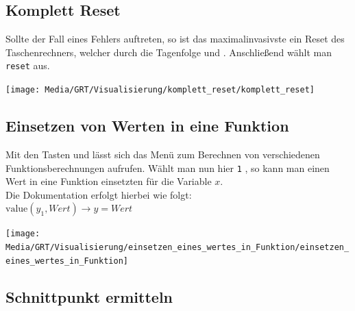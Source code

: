 \subsection{Komplett Reset}\label{sec:Komplett Reset}
\begin{paracol}{2}
\begin{flushleft}
	Sollte der Fall eines Fehlers auftreten, so ist das maximalinvasivste ein Reset des Taschenrechners, welcher durch die Tagenfolge  und \gtr{+}. Anschließend wählt man \texttt{reset} aus.
\end{flushleft}
\switchcolumn
\begin{flushright}
	\texttt{[image: Media/GRT/Visualisierung/komplett\_reset/komplett\_reset]}
\end{flushright}	
\end{paracol}

\subsection{Einsetzen von Werten in eine Funktion}\label{sec:Einsetzen von Werten in eine Funktion}
\begin{paracol}{2}
\begin{flushleft}
	Mit den Tasten  und  lässt sich das Menü zum Berechnen von verschiedenen Funktionsberechnungen aufrufen. Wählt man nun hier \texttt{1} , so kann man einen Wert in eine Funktion einsetzten für die Variable $x$.\\
	Die Dokumentation erfolgt hierbei wie folgt: \\
	$\mathrm{value}(y_1,\mathit{Wert}) \rightarrow y=\mathit{Wert}$
	
\end{flushleft}
\switchcolumn
\begin{flushright}
	\texttt{[image: Media/GRT/Visualisierung/einsetzen\_eines\_wertes\_in\_Funktion/einsetzen\_eines\_wertes\_in\_Funktion]}
\end{flushright}
\end{paracol}
\pagebreak
\subsection{Schnittpunkt ermitteln}\label{sec:Schnittpunkt ermitteln}

